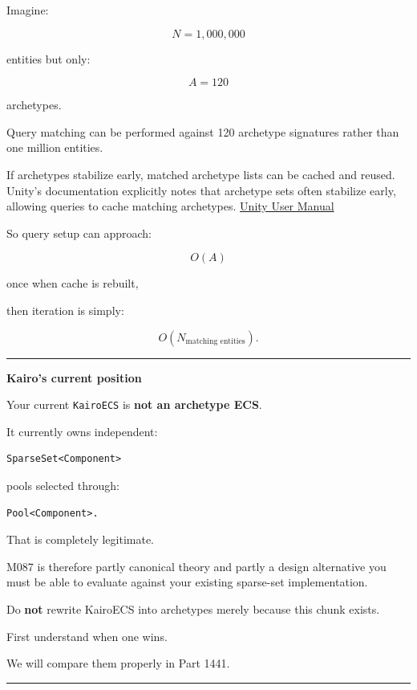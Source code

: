 Imagine:

\[
N=1,000,000
\]

entities but only:

\[
A=120
\]

archetypes.

Query matching can be performed against 120 archetype signatures rather than one million entities.

If archetypes stabilize early, matched archetype lists can be cached and reused. Unity's documentation explicitly notes that archetype sets often stabilize early, allowing queries to cache matching archetypes. \href{https://docs.unity.cn/Packages/com.unity.entities\%401.0/manual/concepts-archetypes.html?utm_source=chatgpt.com}{Unity User Manual}

So query setup can approach:

\[
O(A)
\]

once when cache is rebuilt,

then iteration is simply:

\[
O(N_{\text{matching entities}}).
\]

\begin{center}\rule{0.5\linewidth}{0.5pt}\end{center}

\textbf{Kairo's current position}

Your current \texttt{KairoECS} is \textbf{not an archetype ECS}.

It currently owns independent:

\begin{verbatim}
SparseSet<Component>
\end{verbatim}

pools selected through:

\begin{verbatim}
Pool<Component>.
\end{verbatim}

That is completely legitimate.

M087 is therefore partly canonical theory and partly a design alternative you must be able to evaluate against your existing sparse-set implementation.

Do \textbf{not} rewrite KairoECS into archetypes merely because this chunk exists.

First understand when one wins.

We will compare them properly in Part 1441.

\begin{center}\rule{0.5\linewidth}{0.5pt}\end{center}

